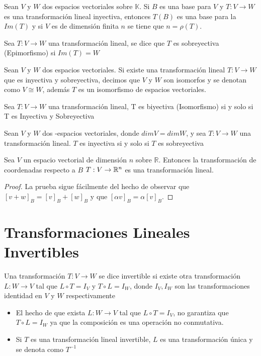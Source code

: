 \begin{theorem}
Sean $V$ y $W$ dos espacios vectoriales sobre $\mathbb{K}$. Si $B$ es una base para $V$ y $T : V \to W$ es una transformación lineal inyectiva, entonces $T(B)$ es una base para la $Im(T)$ y si $V$ es de dimensión finita $n$ se tiene que $n = \rho(T)$.\\

\end{theorem}
\begin{dfn}
Sea $T: V \to W$ una transformación lineal, se dice que $T$ es sobreyectiva (Epimorfismo) si $Im(T) = W$
\end{dfn}
\begin{dfn}
Sean $V$ y $W$ dos espacios vectoriales. Si existe una transformación lineal $T : V \to W$ que es inyectiva y sobreyectiva, decimos que $V$ y $W$ son isomorfos y se denotan como $V \cong W$, además $T$ es un isomorfismo de espacios vectoriales.
\end{dfn}

\begin{dfn}
Sea $T: V \to W$ una transformación lineal, T es biyectiva (Isomorfismo) si y solo si T es Inyectiva y Sobreyectiva
\end{dfn}

\begin{theorem}
Sean $V$ y $W$ dos \dobleK-espacios vectoriales, donde $dimV = dimW$, y sea $T: V \to W$ una transformación lineal. $T$ es inyectiva si y solo si $T$ es sobreyectiva
\end{theorem}

\begin{theorem}
Sea $V$ un espacio vectorial de dimensión $n$ sobre $\mathbb{R}$. Entonces la transformación de coordenadas respecto a $B$ $T : V \to \mathbb{R}^n$ es una transformación lineal.
\end{theorem}

\begin{proof}
La prueba sigue fácilmente del hecho de observar que $[v + w]_B = [v]_B + [w]_B$ y que $[\alpha v]_B = \alpha [v]_B$.
\end{proof}

\section{Transformaciones Lineales Invertibles}
\begin{dfn}
Una transformación $T: V \to W$ se dice invertible si existe otra transformación $L: W \to V$ tal que $L \circ T = I_V$ y $T \circ L = I_W$, donde $I_V , I_W$ son las transformaciones identidad en $V$ y $W$ respectivamente 
\end{dfn}
\begin{obs}
\begin{itemize}
    \item El hecho de que exista $L: W \to V$ tal que $L \circ T = I_V$, no garantiza que $T \circ L = I_W$ ya que la composición es una operación no conmutativa.
    \item Si $T$ es una transformación lineal invertible, $L$ es una transformación única y se denota como $T^{-1}$
\end{itemize}
\end{obs}

